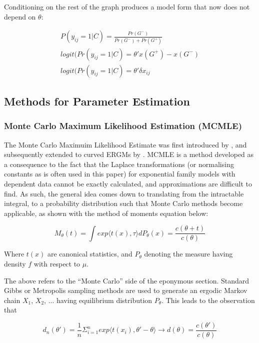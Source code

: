 Conditioning on the rest of the graph produces a model form that now does not depend on $\theta$:

\begin{equation}
\label{eqn:ergm_no_theta}
\begin{aligned}
P(y_{ij} = 1|C) = \frac{Pr(G^-)}{Pr(G^-) + Pr(G^+)} \\
logit(Pr(y_{ij} = 1|C) = \theta'{x(G^+) - x(G^-)} \\
logit(Pr(y_{ij} = 1|C) = \theta'\delta x_{ij}
\end{aligned}
\end{equation}

\subsection{Methods for Parameter Estimation}

\subsubsection{Monte Carlo Maximum Likelihood Estimation (MCMLE)}

The Monte Carlo Maximuim Likelihood Estimate was first introduced by \cite{geyerthompson1992}, and subsequently extended to curved ERGMs by \cite{hunterhandcock2006}. MCMLE is a method developed as a consequence to the fact that the  Laplace transformations (or normalising constants as is often used in this paper) for exponential family models with dependent data cannot be exactly calculated, and approximations are difficult to find. As such, the general idea comes down to translating from the intractable integral, to a probability distribution such that Monte Carlo methods become applicable, as shown with the method of moments equation below:

\begin{equation}
M_\theta(t) = \int{exp{\langle t(x), \tau \rangle}dP_\theta(x)} = \frac{c(\theta + t)}{c(\theta)}
\end{equation}

Where $t(x)$ are canonical statistics, and $P_\theta$ denoting the measure having density $f$ with respect to $\mu$.

The above refers to the ``Monte Carlo'' side of the eponymous section. Standard Gibbs or Metropolis sampling methods are used to generate an ergodic Markov chain $X_1$, $X_2$, ... having equilibrium distribution $P_\theta$. This leads to the observation that

\begin{equation}
\label{eq:mcmle_importance_sampling}
d_n(\theta') =  \frac{1}{n}\Sigma_{i=1}^n exp{\langle t(x_i), \theta' - \theta \rangle} \rightarrow d(\theta) = \frac{c(\theta')}{c(\theta)}
\end{equation}

